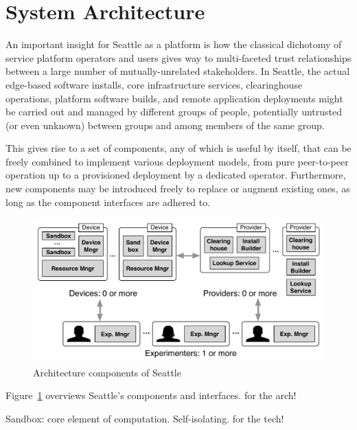 \section{System Architecture}

An important insight for Seattle as a platform is how the classical
dichotomy of service platform operators and users gives way to multi-faceted
trust relationships between a large number of mutually-unrelated
stakeholders.
In Seattle, the actual edge-based software installs, core infrastructure
services, clearinghouse operations, platform software builds, and remote
application deployments might be carried out and managed by different
groups of people, potentially untrusted (or even unknown) between groups
and among members of the same group.

This gives rise to a set of components, any of which is useful
by itself, that can be freely combined to implement various
deployment models, from pure peer-to-peer operation up to a
provisioned deployment by a dedicated operator. Furthermore,
new components may be introduced freely to replace or augment
existing ones, as long as the component interfaces are adhered to.



\begin{figure}
  \centering
  \includegraphics[width=\columnwidth]{figures/arch.pdf}
  \caption{Architecture components of Seattle}
  \label{fig:arch}
\end{figure}



Figure~\ref{fig:arch} overviews Seattle's components and interfaces.
\cite{Cappos2009} for the arch!

Sandbox: core element of computation. Self-isolating.
\cite{RepySandbox,li2015fence} for the tech!

